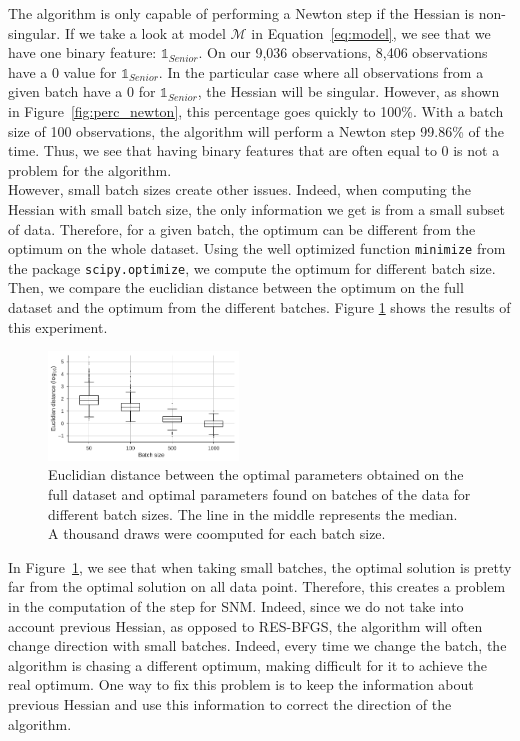 \documentclass[conference]{IEEEtran}
\begin{document}
The algorithm is only capable of performing a Newton step if the Hessian is non-singular. If we take a look at model $\mathcal{M}$ in Equation~\ref{eq:model}, we see that we have one binary feature: $\mathbb{1}_{Senior}$. On our 9,036 observations, 8,406 observations have a 0 value for $\mathbb{1}_{Senior}$. In the particular case where all observations from a given batch have a 0 for $\mathbb{1}_{Senior}$, the Hessian will be singular. However, as shown in Figure~\ref{fig:perc_newton}, this percentage goes quickly to 100\%. With a batch size of 100 observations, the algorithm will perform a Newton step 99.86\% of the time. Thus, we see that having binary features that are often equal to 0 is not a problem for the algorithm. \\

However, small batch sizes create other issues. Indeed, when computing the Hessian with small batch size, the only information we get is from a small subset of data. Therefore, for a given batch, the optimum can be different from the optimum on the whole dataset. Using the well optimized function \texttt{minimize} from the package \texttt{scipy.optimize}, we compute the optimum for different batch size. Then, we compare the euclidian distance between the optimum on the full dataset and the optimum from the different batches. Figure \ref{fig:batch_dist} shows the results of this experiment.

\begin{figure}[t]
\centering
\includegraphics[width=0.45\textwidth]{../figures/dist.pdf}
\vspace{-0.3cm}
\caption{Euclidian distance between the optimal parameters obtained on the full dataset and optimal parameters found on batches of the data for different batch sizes. The line in the middle represents the median. A thousand draws were coomputed for each batch size.}
\label{fig:batch_dist}
\vspace{-0.5cm}
\end{figure}

In Figure~\ref{fig:batch_dist}, we see that when taking small batches, the optimal solution is pretty far from the optimal solution on all data point. Therefore, this creates a problem in the computation of the step for SNM. Indeed, since we do not take into account previous Hessian, as opposed to RES-BFGS, the algorithm will often change direction with small batches. Indeed, every time we change the batch, the algorithm is chasing a different optimum, making difficult for it to achieve the real optimum. One way to fix this problem is to keep the information about previous Hessian and use this information to correct the direction of the algorithm.
\end{document}
